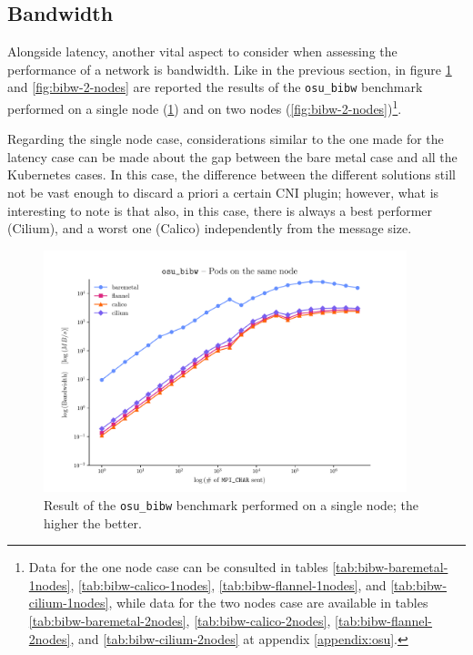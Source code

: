 \clearpage

\subsection{Bandwidth}\label{subsec:results-bandwidth}

Alongside latency, another vital aspect to consider when assessing the
performance of a network is bandwidth.
Like in the previous section, in figure \ref{fig:bibw-1-node} and
\ref{fig:bibw-2-nodes} are reported the results of the \texttt{osu\_bibw}
benchmark performed on a single node (\ref{fig:bibw-1-node}) and on two nodes
(\ref{fig:bibw-2-nodes})\footnote{
  Data for the one node case can be consulted in
  tables \ref{tab:bibw-baremetal-1nodes}, \ref{tab:bibw-calico-1nodes},
  \ref{tab:bibw-flannel-1nodes}, and \ref{tab:bibw-cilium-1nodes}, while data
  for the two nodes case are available in tables
  \ref{tab:bibw-baremetal-2nodes}, \ref{tab:bibw-calico-2nodes},
  \ref{tab:bibw-flannel-2nodes}, and \ref{tab:bibw-cilium-2nodes} at appendix
  \ref{appendix:osu}.
}.

Regarding the single node case, considerations similar to the one made for the
latency case can be made about the gap between the bare metal case and all the
Kubernetes cases.
In this case, the difference between the different solutions still not be vast
enough to discard a priori a certain CNI plugin; however, what is interesting to
note is that also, in this case, there is always a best performer (Cilium), and
a worst one (Calico) independently from the message size.

\begin{figure}
  \centering
  \includegraphics[width=0.94\textwidth]{img/chpt3/bibw-1-node}
  \caption{Result of the \texttt{osu\_bibw} benchmark performed on a single
    node; the higher the better.}
  \label{fig:bibw-1-node}
\end{figure}

